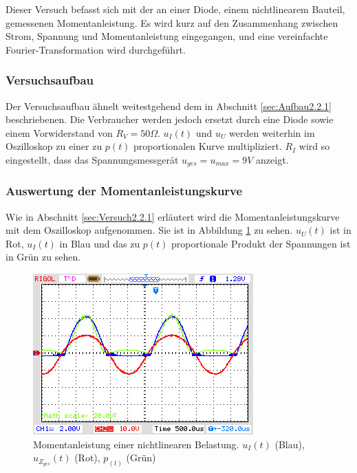 
Dieser Versuch befasst sich mit der an einer Diode, einem nichtlinearem Bauteil, gemessenen Momentanleistung. Es wird kurz auf den Zusammenhang zwischen Strom, Spannung und Momentanleistung eingegangen, und eine vereinfachte Fourier-Transformation wird durchgeführt.

\subsubsection{Versuchsaufbau}
Der Versuchsaufbau ähnelt weitestgehend dem in Abschnitt \ref{sec:Aufbau2.2.1} beschriebenen. Die Verbraucher werden jedoch ersetzt durch eine Diode sowie einem Vorwiderstand von $R_V=50\Omega$. $u_I(t)$ und $u_U$ werden weiterhin im Oszilloskop zu einer zu $p(t)$ proportionalen Kurve multipliziert.
$R_I$ wird so eingestellt, dass das Spannungsmessgerät $u_{ges} = u_{max} = 9V$ anzeigt.

\subsubsection{Auswertung der Momentanleistungskurve}

Wie in Abschnitt \ref{sec:Versuch2.2.1} erläutert wird die Momentanleistungskurve mit dem Oszilloskop aufgenommen. Sie ist in Abbildung \ref{fig:MomLKurveNichtlinear} zu sehen. $u_U(t)$ ist in Rot, $u_I(t)$ in Blau und das zu $p(t)$ proportionale Produkt der Spannungen ist in Grün zu sehen.

\begin{figure}[H]
\centering
\includegraphics[width=0.8\linewidth]{Oszi-Bitmaps/NewFile5.jpg}
\caption{Momentanleistung einer nichtlinearen Belastung. $u_I(t)$ (Blau), $u_{Z_{ges}}(t)$ (Rot), $p_(t)$ (Grün)}
\label{fig:MomLKurveNichtlinear}
\end{figure}


